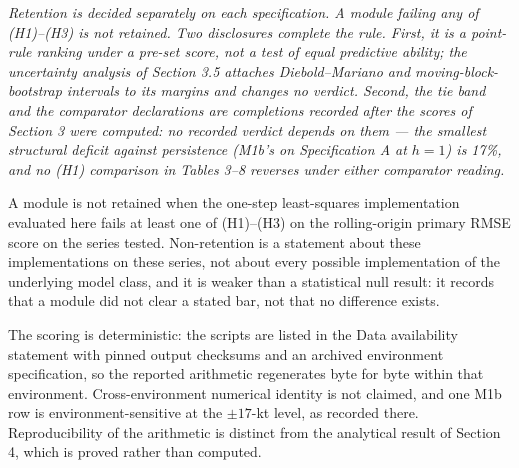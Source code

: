 \documentclass[11pt]{article}
\begin{document}
\emph{Retention is decided separately on each specification. A module
failing any of (H1)--(H3) is not retained. Two disclosures complete the
rule. First, it is a point-rule ranking under a pre-set score, not a
test of equal predictive ability; the uncertainty analysis of
Section 3.5 attaches Diebold--Mariano and moving-block-bootstrap
intervals to its margins and changes no verdict. Second, the tie band
and the comparator declarations are completions recorded after the
scores of Section 3 were computed: no recorded verdict depends on them
--- the smallest structural deficit against persistence (M1b's on
Specification A at \(h=1\)) is 17\%, and no (H1) comparison in Tables
3--8 reverses under either comparator reading.}

A module is not retained when the one-step least-squares implementation
evaluated here fails at least one of (H1)--(H3) on the rolling-origin
primary RMSE score on the series tested. Non-retention is a statement
about these implementations on these series, not about every possible
implementation of the underlying model class, and it is weaker than a
statistical null result: it records that a module did not clear a stated
bar, not that no difference exists.

The scoring is deterministic: the scripts are listed in the Data
availability statement with pinned output checksums and an archived
environment specification, so the reported arithmetic regenerates byte
for byte within that environment. Cross-environment numerical
identity is not claimed, and one M1b row is environment-sensitive at
the \(\pm 17\)-kt level, as recorded there.
Reproducibility of the arithmetic is distinct from the analytical result
of Section 4, which is proved rather than computed.
\end{document}
